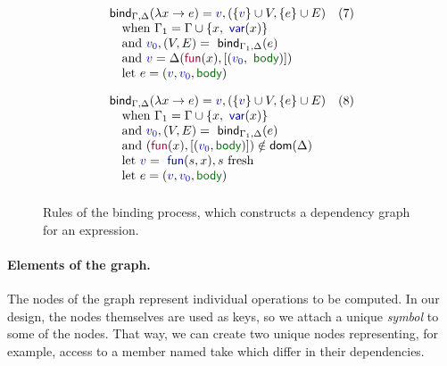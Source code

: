 \documentclass[sigplan,10pt]{acmart}\settopmatter{printfolios=true,printccs=false,printacmref=false}
\newcommand{\ident}[1]{\textnormal{\sffamily #1}}
\newcommand{\bndclr}[1]{\textcolor{kvdclr}{#1}}
\newcommand{\bnd}[1]{\textnormal{\textcolor{kvdclr}{\sffamily #1}}}
\newcommand{\bknd}[1]{\textnormal{\textcolor{prepclr}{\sffamily #1}}}
\newcommand{\blbl}[1]{\textnormal{\textcolor{numclr}{\sffamily #1}}}
\begin{document}
\begin{figure}[t]
\begin{equation*}
\begin{array}{ll}
\\[1em]
\ident{bind}_{\Gamma, \Delta}(\lambda x \rightarrow e) = \bndclr{v}, (\{\bndclr{v}\} \cup V, \{e\} \cup E)&(7)\\
\quad \textnormal{when}~\Gamma_1 = \Gamma \cup \{ x, \bnd{var}(x) \}\\
\quad \textnormal{and}~\bndclr{v_0}, (V, E) = \ident{bind}_{\Gamma_1, \Delta}(e)\\
\quad \textnormal{and}~\bndclr{v} = \Delta(\bknd{fun}(x),[(\bndclr{v_0}, \blbl{body})])\\
\quad \textnormal{let}~e = (\bndclr{v}, \bndclr{v_0}, \blbl{body}) 
\\[1em]
\ident{bind}_{\Gamma, \Delta}(\lambda x \rightarrow e) = \bndclr{v}, (\{\bndclr{v}\} \cup V, \{e\} \cup E)&(8)\\
\quad \textnormal{when}~\Gamma_1 = \Gamma \cup \{ x, \bnd{var}(x) \}\\
\quad \textnormal{and}~\bndclr{v_0}, (V, E) = \ident{bind}_{\Gamma_1, \Delta}(e)\\
\quad \textnormal{and}~(\bknd{fun}(x),[(\bndclr{v_0}, \blbl{body})])\notin \ident{dom}(\Delta)\\
\quad \textnormal{let}~\bndclr{v} = \bnd{fun}(s, x), s~\textnormal{fresh}\\
\quad \textnormal{let}~e = (\bndclr{v},\bndclr{v_0},\blbl{body}) 
\\[0.5em]
\end{array}
\end{equation*}
\vspace{-0.5em}
\caption{Rules of the binding process, which constructs a dependency graph for an expression.}
\label{fig:binding-rules}
\end{figure}

\paragraph{Elements of the graph.} The nodes of the graph represent individual operations
to be computed. In our design, the nodes themselves are used as keys, so we attach a unique 
\emph{symbol} to some of the nodes. That way, we can create two unique nodes representing, 
for example, access to a member named \ident{take} which differ in their dependencies.
\end{document}
